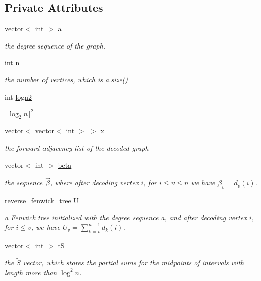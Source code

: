 \subsection*{Private Attributes}
\begin{DoxyCompactItemize}
\item 
vector$<$ int $>$ \hyperlink{classgraph__decoder_a9dd7c3c11b8a45a12cb7c3c2d2bfa2cc}{a}
\begin{DoxyCompactList}\small\item\em the degree sequence of the graph. \end{DoxyCompactList}\item 
int \hyperlink{classgraph__decoder_a6bc1e72b2f7a913d14b789a6c2d92c1e}{n}
\begin{DoxyCompactList}\small\item\em the number of vertices, which is a.\+size() \end{DoxyCompactList}\item 
int \hyperlink{classgraph__decoder_a59663482843ffa5059128bd6ed866f11}{logn2}
\begin{DoxyCompactList}\small\item\em $\lfloor \log_2 n \rfloor^2$ \end{DoxyCompactList}\item 
vector$<$ vector$<$ int $>$ $>$ \hyperlink{classgraph__decoder_aa3f2776afe387668cf7f68109428e14e}{x}
\begin{DoxyCompactList}\small\item\em the forward adjacency list of the decoded graph \end{DoxyCompactList}\item 
vector$<$ int $>$ \hyperlink{classgraph__decoder_aa57c11e4c09c52101682ff83286162f7}{beta}
\begin{DoxyCompactList}\small\item\em the sequence $\vec{\beta}$, where after decoding vertex $i$, for $i \leq v\leq n$ we have $\beta_v = d_v(i)$. \end{DoxyCompactList}\item 
\hyperlink{classreverse__fenwick__tree}{reverse\+\_\+fenwick\+\_\+tree} \hyperlink{classgraph__decoder_a2fa9fec2cef06aaa410e57fb59d5c1ad}{U}
\begin{DoxyCompactList}\small\item\em a Fenwick tree initialized with the degree sequence a, and after decoding vertex $i$, for $i \leq v$, we have $U_v = \sum_{k=v}^{n-1} d_k(i)$. \end{DoxyCompactList}\item 
vector$<$ int $>$ \hyperlink{classgraph__decoder_ac466636b9b21122f4fa0246aa624978c}{tS}
\begin{DoxyCompactList}\small\item\em the $\tilde{S}$ vector, which stores the partial sums for the midpoints of intervals with length more than $\log^2 n$. \end{DoxyCompactList}\end{DoxyCompactItemize}



